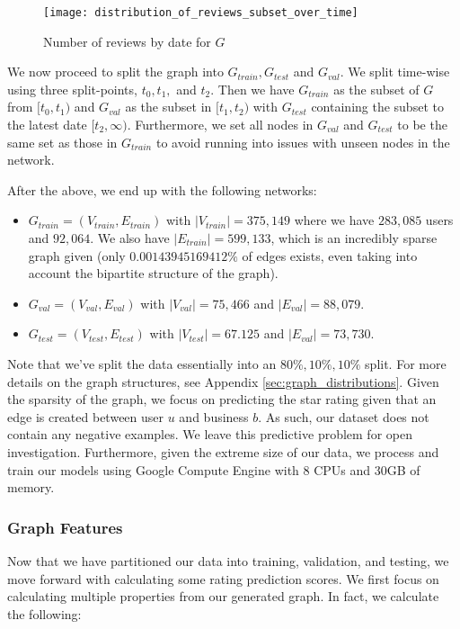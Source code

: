 \documentclass[letterpaper, 10 pt, conference]{ieeeconf}  %
\begin{document}
\begin{figure}[h!]
\centering
\texttt{[image: distribution\_of\_reviews\_subset\_over\_time]}
\caption{Number of reviews by date for $G$}
\label{fig:reviews_subset_over_time}
\end{figure}

We now proceed to split the graph into $G_{train}, G_{test}$ and $G_{val}$. We split time-wise using three split-points, $t_0, t_1,$ and $t_2$. Then we have $G_{train}$ as the subset of $G$ from $[t_0, t_1)$ and $G_{val}$ as the subset in $[t_1, t_2)$ with $G_{test}$ containing the subset to the latest date $[t_2, \infty)$. Furthermore, we set all nodes in $G_{val}$ and $G_{test}$ to be the same set as those in $G_{train}$ to avoid running into issues with unseen nodes in the network.

After the above, we end up with the following networks:
\begin{itemize}
\item $G_{train} = (V_{train}, E_{train})$ with $|V_{train}| = 375,149$ where we have $283,085$ users and $92,064$. We also have $|E_{train}| = 599,133$, which is an incredibly sparse graph given (only $0.00143945169412\%$ of edges exists, even taking into account the bipartite structure of the graph).
\item $G_{val} = (V_{val}, E_{val})$ with $|V_{val}| = 75,466$ and $|E_{val}| = 88,079$.
\item $G_{test} = (V_{test}, E_{test})$ with $|V_{test}| = 67.125$ and $|E_{val}| = 73,730$.
\end{itemize}

Note that we've split the data essentially into an $80\%, 10\%, 10\%$ split. For more details on the graph structures, see Appendix \ref{sec:graph_distributions}. Given the sparsity of the graph, we focus on predicting the star rating given that an edge is created between user $u$ and business $b$. As such, our dataset does not contain any negative examples. We leave this predictive problem for open investigation. Furthermore, given the extreme size of our data, we process and train our models using Google Compute Engine with 8 CPUs and 30GB of memory.

\subsubsection{Graph Features}
Now that we have partitioned our data into training, validation, and testing, we move forward with calculating some rating prediction scores. We first focus on calculating multiple properties from our generated graph. In fact, we calculate the following:
\end{document}
